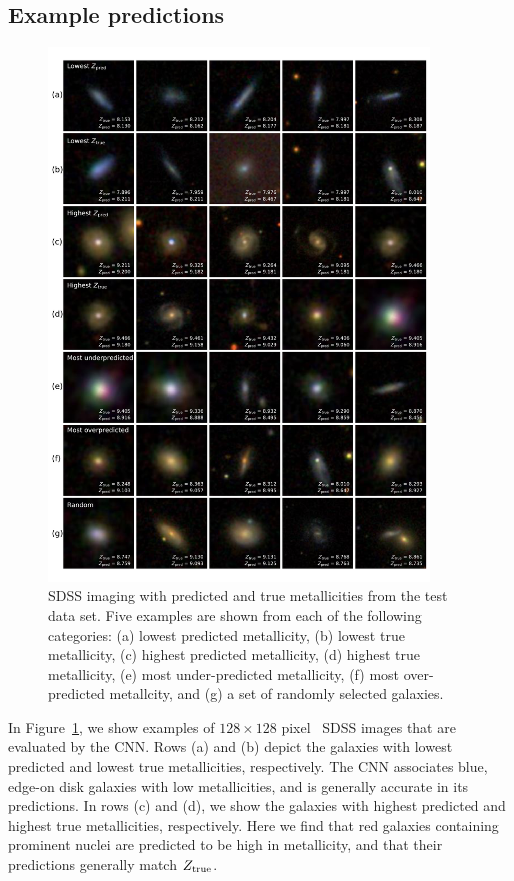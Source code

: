 \documentclass[fleqn,usenatbib]{mnras}
\begin{document}
\subsection{Example predictions}
\begin{figure}
	\includegraphics[width=0.9\textwidth]{01-prediction_examples.pdf}
	\caption{\label{fig:examples}
		SDSS imaging with predicted and true metallicities from the test data set. Five examples are shown from each of the following categories: (a) lowest predicted metallicity, (b) lowest true metallicity, (c) highest predicted metallicity, (d) highest true metallicity, (e) most under-predicted metallicity, (f) most over-predicted metallcity, and (g) a set of randomly selected galaxies.}
\end{figure}

In Figure~\ref{fig:examples}, we show examples of $128 \times 128$ pixel \sdssg\sdssr\sdssi\ SDSS images that are evaluated by the CNN. Rows (a) and (b) depict the galaxies with lowest predicted and lowest true metallicities, respectively. The CNN associates blue, edge-on disk galaxies with low metallicities, and is generally accurate in its predictions. In rows (c) and (d), we show the galaxies with highest predicted and highest true metallicities, respectively. Here we find that red galaxies containing prominent nuclei are predicted to be high in metallicity, and that their predictions generally match $Z_{\rm true}$.
\end{document}
